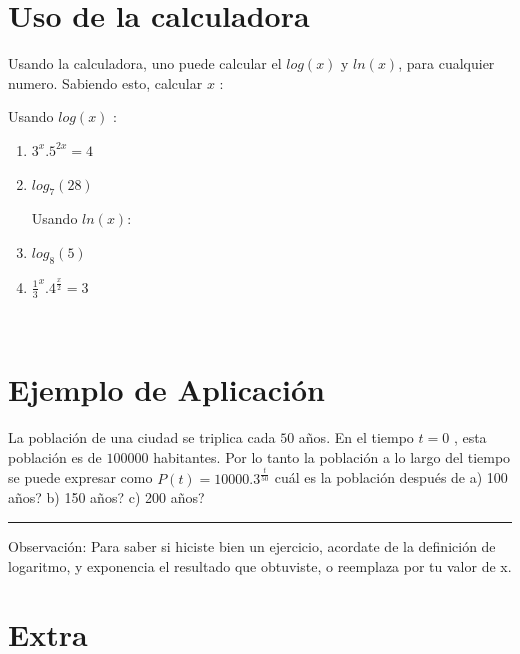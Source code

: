 \documentclass[a4paper,11pt,spanish,sans]{exam}
\begin{document}
\section{Uso de la calculadora}
Usando la calculadora, uno puede calcular el $log(x)$ y $ln(x)$, para cualquier numero. Sabiendo esto, calcular $x$ :


\begin{multicols}{2}
Usando $log(x)$ :

\begin{enumerate}
\item  $ 3^{x}.5^{2x}=4 $

\item  $ log_7(28) $

\columnbreak 

Usando $ln(x)$:

\item $log_8(5)$

\item $\frac{1}{3}^{x}.4^{\frac{x}{2}}=3$
\end{enumerate}
\end{multicols}
\\

\section{Ejemplo de Aplicación}
La población de una ciudad se triplica cada $50$ años. En el tiempo $t = 0$ , esta población es de $100000$ habitantes. Por lo tanto la población a lo largo del tiempo se puede expresar como $P(t)=10000.3^{\frac{t}{50}}$
cuál es la población después de 
a) 100 años? 
b) 150 años? 
c) 200 años? \\


\rule[2ex]{\textwidth}{2pt}


Observación: Para saber si hiciste bien un ejercicio, acordate de la definición de logaritmo, y exponencia el resultado que obtuviste, o reemplaza por tu valor de x.



\section*{Extra}
\end{document}
